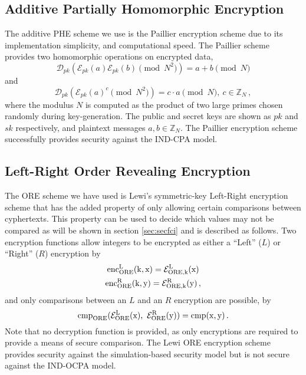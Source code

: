 \documentclass[letterpaper, 10 pt, conference]{ieeeconf}  %
\begin{document}
\subsection{Additive Partially Homomorphic Encryption} \label{subsec:paillier}
The additive PHE scheme we use is the Paillier encryption scheme \cite{paillierPublicKeyCryptosystemsBased1999} due to its implementation simplicity, and computational speed. The Paillier scheme provides two homomorphic operations on encrypted data, 
\begin{equation}
   \mathcal{D}_{pk}(\mathcal{E}_{pk}(a)\mathcal{E}_{pk}(b) \!\!\pmod{N^{2}}) = a + b \!\!\pmod{N} \label{eqn:paillier_add}
\end{equation}
and
\begin{equation}
   \mathcal{D}_{pk}(\mathcal{E}_{pk}(a)^c \!\!\pmod{N^{2}}) = c\cdot a \!\!\pmod{N},\ c \in \mathbb{Z}_N\,, \label{eqn:paillier_mult}
\end{equation}
where the modulus $N$ is computed as the product of two large primes chosen randomly during key-generation. The public and secret keys are shown as $pk$ and $sk$ respectively, and plaintext messages $a,b \in \mathbb{Z}_N$. The Paillier encryption scheme successfully provides security against the IND-CPA model.

\subsection{Left-Right Order Revealing Encryption} \label{subsec:lewi}
The ORE scheme we have used is Lewi's symmetric-key Left-Right encryption scheme \cite{lewiOrderRevealingEncryptionNew2016} that has the added property of only allowing certain comparisons between cyphertexts. This property can be used to decide which values may not be compared as will be shown in section \ref{sec:secfci} and is described as follows. Two encryption functions allow integers to be encrypted as either a ``Left'' ($L$) or ``Right'' ($R$) encryption by
\begin{equation}
   \begin{gathered} \label{eqn:lewi_l_r}
      \operatorfont{enc}^L_{ORE}(k, x) = \mathcal{E}^L_{ORE,k}(x) \\
      \operatorfont{enc}^R_{ORE}(k, y) = \mathcal{E}^R_{ORE,k}(y)\,,
   \end{gathered}
\end{equation}
and only comparisons between an $L$ and an $R$ encryption are possible, by
\begin{equation}
   \operatorfont{cmp}_{ORE}(\mathcal{E}^L_{ORE}(x),\ \mathcal{E}^R_{ORE}(y)) = \operatorfont{cmp}(x, y)\,. \label{eqn:lewi_cmp}
\end{equation}
Note that no decryption function is provided, as only encryptions are required to provide a means of secure comparison. The Lewi ORE encryption scheme provides security against the simulation-based security model \cite{chenettePracticalOrderRevealingEncryption2016} but is not secure against the IND-OCPA model.
\end{document}
